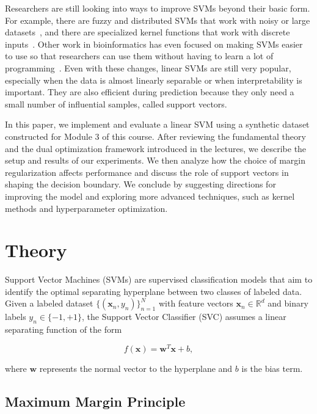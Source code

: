 \documentclass[conference]{IEEEtran}
\begin{document}
	Researchers are still looking into ways to improve SVMs beyond their basic form. For example, there are fuzzy and distributed SVMs that work with noisy or large datasets~\cite{wang2017survey}, and there are specialized kernel functions that work with discrete inputs~\cite{amaya2024distance}. Other work in bioinformatics has even focused on making SVMs easier to use so that researchers can use them without having to learn a lot of programming~\cite{pirooznia2006svm}. Even with these changes, linear SVMs are still very popular, especially when the data is almost linearly separable or when interpretability is important. They are also efficient during prediction because they only need a small number of influential samples, called support vectors.
	
	In this paper, we implement and evaluate a linear SVM using a synthetic dataset constructed for Module 3 of this course. After reviewing the fundamental theory and the dual optimization framework introduced in the lectures, we describe the setup and results of our experiments. We then analyze how the choice of margin regularization affects performance and discuss the role of support vectors in shaping the decision boundary. We conclude by suggesting directions for improving the model and exploring more advanced techniques, such as kernel methods and hyperparameter optimization.

	\section{Theory}
	
	Support Vector Machines (SVMs) are supervised classification models that aim to identify the optimal separating hyperplane between two classes of labeled data. Given a labeled dataset $\{(\mathbf{x}_n, y_n)\}_{n=1}^N$ with feature vectors $\mathbf{x}_n \in \mathbb{R}^d$ and binary labels $y_n \in \{-1,+1\}$, the Support Vector Classifier (SVC) assumes a linear separating function of the form
	
	\begin{equation}
		f(\mathbf{x}) = \mathbf{w}^T \mathbf{x} + b,
	\end{equation}
	
	where $\mathbf{w}$ represents the normal vector to the hyperplane and $b$ is the bias term.
	
	\subsection{Maximum Margin Principle}
	
\end{document}
